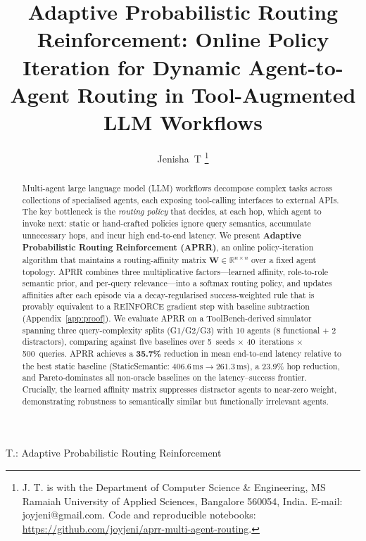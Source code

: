 \documentclass[journal,twocolumn,letterpaper]{IEEEtran}
\newcommand{\APRR}{\textsc{APRR}}
\newcommand{\WW}{\mathbf{W}}
\newcommand{\RR}{\mathbb{R}}
\begin{document}
\title{Adaptive Probabilistic Routing Reinforcement: Online Policy Iteration
       for Dynamic Agent-to-Agent Routing in Tool-Augmented LLM Workflows}

\author{Jenisha~T%
\thanks{J. T. is with the Department of Computer Science \& Engineering,
        MS Ramaiah University of Applied Sciences, Bangalore 560054, India.
        E-mail: joyjeni@gmail.com.
        Code and reproducible notebooks:
        \url{https://github.com/joyjeni/aprr-multi-agent-routing}.}}

%
{T.: Adaptive Probabilistic Routing Reinforcement}

\maketitle

\begin{abstract}
Multi-agent large language model (LLM) workflows decompose complex tasks across
collections of specialised agents, each exposing tool-calling interfaces to
external APIs.  The key bottleneck is the \emph{routing policy} that decides,
at each hop, which agent to invoke next: static or hand-crafted policies ignore
query semantics, accumulate unnecessary hops, and incur high end-to-end
latency.  We present \textbf{Adaptive Probabilistic Routing Reinforcement
(\APRR{})}, an online policy-iteration algorithm that maintains a routing-affinity
matrix $\WW\in\RR^{n\times n}$ over a fixed agent topology.  \APRR{} combines
three multiplicative factors---learned affinity, role-to-role semantic prior,
and per-query relevance---into a softmax routing policy, and updates affinities
after each episode via a decay-regularised success-weighted rule that is
provably equivalent to a REINFORCE gradient step with baseline subtraction
(Appendix~\ref{app:proof}).  We evaluate \APRR{} on a ToolBench-derived
simulator spanning three query-complexity splits (G1/G2/G3) with 10 agents
(8 functional + 2 distractors), comparing against five baselines over
5~seeds $\times$ 40~iterations $\times$ 500~queries.  \APRR{} achieves a
\textbf{35.7\%} reduction in mean end-to-end latency relative to the
best static baseline (StaticSemantic: $406.6\,\mathrm{ms}\to261.3\,\mathrm{ms}$),
a 23.9\% hop reduction, and Pareto-dominates all non-oracle baselines on the
latency--success frontier.  Crucially, the learned affinity matrix suppresses
distractor agents to near-zero weight, demonstrating robustness to semantically
similar but functionally irrelevant agents.
\end{abstract}
\end{document}
